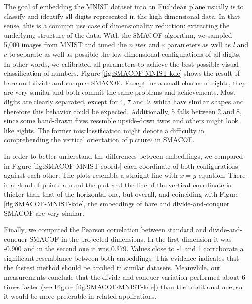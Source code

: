 The goal of embedding the MNIST dataset into an Euclidean plane usually is to classify and identify all digits represented in the high-dimensional data. In that sense, this is a common use case of dimensionality reduction: extracting the underlying structure of the data. With the SMACOF algorithm, we sampled 5,000 images from MNIST and tuned the $n\_iter$ and $\varepsilon$ parameters as well as $l$ and $c$ to separate as well as possible the low-dimensional configurations of all digits. In other words, we calibrated all parameters to achieve the best possible visual classification of numbers. Figure \ref{fig:SMACOF-MNIST-kde} shows the result of bare and divide-and-conquer SMACOF. Except for a small cluster of eights, they are very similar and both commit the same problems and achievements. Most digits are clearly separated, except for 4, 7 and 9, which have similar shapes and therefore this behavior could be expected. Additionally, 5 falls between 2 and 8, since some hand-drawn fives resemble upside-down twos and others might look like eights. The former misclassification might denote a difficulty in comprehending the vertical orientation of pictures in SMACOF.

In order to better understand the differences between embeddings, we compared in Figure \ref{fig:SMACOF-MNIST-coords} each coordinate of both configurations against each other. The plots resemble a straight line with $x=y$ equation. There is a cloud of points around the plot and the line of the vertical coordinate is thicker than that of the horizontal one, but overall, and coinciding with Figure \ref{fig:SMACOF-MNIST-kde}, the embeddings of bare and divide-and-conquer SMACOF are very similar.

Finally, we computed the Pearson correlation between standard and divide-and-conquer SMACOF in the projected dimensions. In the first dimension it was -0.900 and in the second one it was 0.879. Values close to -1 and 1 corroborate a significant resemblance between both embeddings. This evidence indicates that the fastest method should be applied in similar datasets. Meanwhile, our measurements conclude that the divide-and-conquer variation performed about 6 times faster (see Figure \ref{fig:SMACOF-MNIST-kde}) than the traditional one, so it would be more preferable in related applications.

